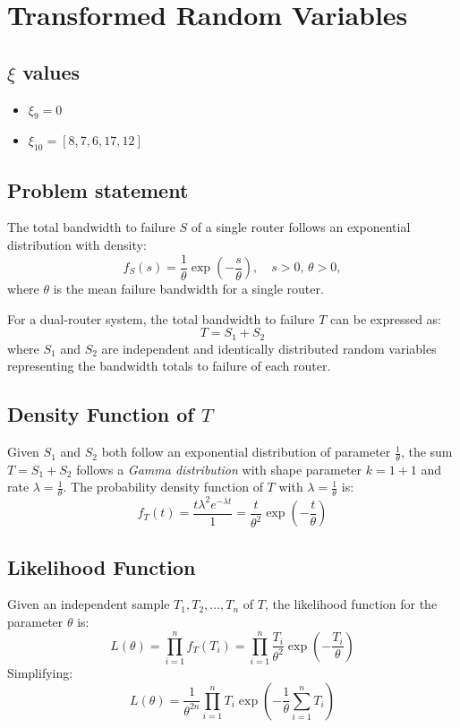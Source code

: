 \chapter{Transformed Random Variables}

\section*{$\xi$ values}

\begin{itemize}
    \item $\xi_9 = 0$
    \item $\xi_10 = [8,7,6,17,12]$
\end{itemize}



\section{Problem statement}
The total bandwidth to failure $ S $ of a single router follows an exponential distribution with density:
\begin{equation}
f_S(s) = \frac{1}{\theta} \exp\left(-\frac{s}{\theta}\right), \quad s > 0, \, \theta > 0,
\end{equation}
where $ \theta $ is the mean failure bandwidth for a single router.

For a dual-router system, the total bandwidth to failure $ T $ can be expressed as:
\begin{equation}
T = S_{1} + S_{2}
\end{equation}
where $ S_{1} $ and $ S_{2} $ are independent and identically distributed random variables representing the bandwidth totals to failure of each router.

\section{Density Function of $ T $}
Given $ S_{1}$ and $ S_{2}$ both follow an exponential distribution of parameter $\frac{1}{\theta}$, the sum $ T = S_{1} + S_{2} $ follows a \emph{Gamma distribution} with shape parameter $ k = 1+1 $ and rate $ \lambda = \frac{1}{\theta} $. The probability density function of $ T $ with  $ \lambda = \frac{1}{\theta} $ is:
\begin{equation}
f_T(t) = \frac{t \lambda^2 e^{-\lambda t}}{1} = \frac{t}{\theta^2} \exp\left(-\frac{t}{\theta}\right)
\end{equation}

\section{Likelihood Function}
Given an independent sample $ T_1, T_2, \dots, T_n $ of $ T $, the likelihood function for the parameter $ \theta $ is:
\begin{equation}
L(\theta) = \prod_{i=1}^n f_T(T_i) = \prod_{i=1}^n \frac{T_i}{\theta^2} \exp\left(-\frac{T_i}{\theta}\right)
\end{equation}
Simplifying:
\begin{equation}
L(\theta) = \frac{1}{\theta^{2n}} \prod_{i=1}^n T_i \exp\left(-\frac{1}{\theta} \sum_{i=1}^n T_i\right)
\end{equation}

